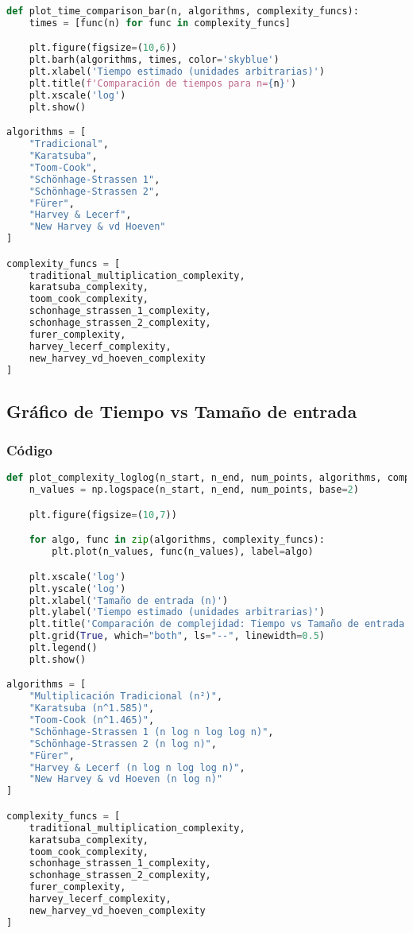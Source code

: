 \begin{lstlisting}[language=Python, caption={Codigo grafico de barras en Python}, label=list:python_code_ex]
def plot_time_comparison_bar(n, algorithms, complexity_funcs):
    times = [func(n) for func in complexity_funcs]

    plt.figure(figsize=(10,6))
    plt.barh(algorithms, times, color='skyblue')
    plt.xlabel('Tiempo estimado (unidades arbitrarias)')
    plt.title(f'Comparación de tiempos para n={n}')
    plt.xscale('log')
    plt.show()

algorithms = [
    "Tradicional",
    "Karatsuba",
    "Toom-Cook",
    "Schönhage-Strassen 1",
    "Schönhage-Strassen 2",
    "Fürer",
    "Harvey & Lecerf",
    "New Harvey & vd Hoeven"
]

complexity_funcs = [
    traditional_multiplication_complexity,
    karatsuba_complexity,
    toom_cook_complexity,
    schonhage_strassen_1_complexity,
    schonhage_strassen_2_complexity,
    furer_complexity,
    harvey_lecerf_complexity,
    new_harvey_vd_hoeven_complexity
]
\end{lstlisting}

\subsection{Gráfico de Tiempo vs Tamaño de entrada}

\subsubsection{Código}

\begin{lstlisting}[language=Python, caption={Codigo grafico de tiempo vs tamaño de entrada en Python}, label=list:python_code_ex]
def plot_complexity_loglog(n_start, n_end, num_points, algorithms, complexity_funcs):
    n_values = np.logspace(n_start, n_end, num_points, base=2)

    plt.figure(figsize=(10,7))

    for algo, func in zip(algorithms, complexity_funcs):
        plt.plot(n_values, func(n_values), label=algo)

    plt.xscale('log')
    plt.yscale('log')
    plt.xlabel('Tamaño de entrada (n)')
    plt.ylabel('Tiempo estimado (unidades arbitrarias)')
    plt.title('Comparación de complejidad: Tiempo vs Tamaño de entrada')
    plt.grid(True, which="both", ls="--", linewidth=0.5)
    plt.legend()
    plt.show()

algorithms = [
    "Multiplicación Tradicional (n²)",
    "Karatsuba (n^1.585)",
    "Toom-Cook (n^1.465)",
    "Schönhage-Strassen 1 (n log n log log n)",
    "Schönhage-Strassen 2 (n log n)",
    "Fürer",
    "Harvey & Lecerf (n log n log log n)",
    "New Harvey & vd Hoeven (n log n)"
]

complexity_funcs = [
    traditional_multiplication_complexity,
    karatsuba_complexity,
    toom_cook_complexity,
    schonhage_strassen_1_complexity,
    schonhage_strassen_2_complexity,
    furer_complexity,
    harvey_lecerf_complexity,
    new_harvey_vd_hoeven_complexity
]
\end{lstlisting}

